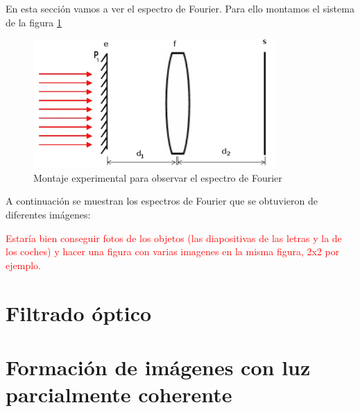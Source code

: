 \documentclass[12pt,a5paper]{article}
\begin{document}
En esta sección vamos a ver el espectro de Fourier. Para ello montamos el sistema de la figura \ref{fig:montaje-fourier}

\begin{figure}[h!]
    \centering
    \includegraphics{montaje-TF.png}
    \caption{Montaje experimental para observar el espectro de Fourier}
    \label{fig:montaje-fourier}
\end{figure}

A continuación se muestran los espectros de Fourier que se obtuvieron de diferentes imágenes:

\textcolor{red}{Estaría bien conseguir fotos de los objetos (las diapositivas de las letras y la de los coches) y hacer una figura con varias imagenes en la misma figura, 2x2 por ejemplo.}






\section{Filtrado óptico}




\section{Formación de imágenes con luz parcialmente coherente}
\end{document}

